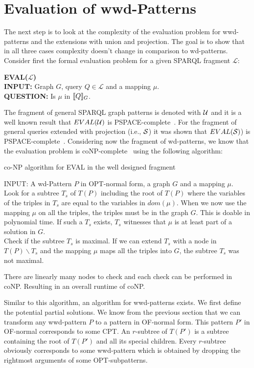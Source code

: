\section{Evaluation of wwd-Patterns}
The next step is to look at the complexity of the evaluation problem for
wwd-patterns and the extensions with union and projection. The goal is to show
that in all three cases complexity doesn't change in comparison to wd-patterns.
Consider first the formal evaluation problem for a given SPARQL fragment $\mathcal{L}$:
\begin{framed}\noindent \textbf{EVAL($\mathcal{L}$)}\\
	\textbf{INPUT:} Graph $G$, query $Q \in  \mathcal{L}$ and a mapping $\mu$.\\
	\textbf{QUESTION:} Is $\mu$ in $\llbracket Q \rrbracket_G$.
\end{framed}
The fragment of general SPARQL graph patterns is denoted with $\mathcal{U}$ and it is a
well known result that $EVAL(\mathcal{U})$ is PSPACE-complete~\cite{perez2009semantics}.
For the fragment of general queries extended with projection (i.e., $\mathcal{S}$)
it was shown that $EVAL(\mathcal{S})$) is PSPACE-complete~\cite{letelier2013static}.
Considering now the fragment of wd-patterns, we know that the evaluation problem
is coNP-complete~\cite{letelier2013static} using the following algorithm:
\begin{algorithm}
	\caption{co-NP algorithm for EVAL in the well designed fragment}
	INPUT: A wd-Pattern $P$ in OPT-normal form, a graph $G$ and a mapping
	$\mu$.\\
	Look for a subtree $T_s$ of $T(P)$ including the root of $T(P)$ where the
		variables of the triples in $T_s$ are equal to the variables in $dom(\mu)$. 
		When we now use the mapping $\mu$ on all the triples, the triples must
		be in the graph $G$. This is doable in polynomial time. If such a $T_s$
		exists, $T_s$ witnesses	that $\mu$ is at least part of a solution in
		$G$.\\
		Check if the subtree $T_s$ is maximal. If we can
		extend $T_s$ with a node in $T(P)\backslash T_s$ and the mapping $\mu$ maps
		all the triples into $G$, the subtree $T_s$ was not maximal. 
\end{algorithm}

There are linearly many nodes to check and each check can be performed in coNP.
Resulting in an overall runtime of coNP.

Similar to this algorithm, an algorithm for wwd-patterns exists. 
We first define the potential partial solutions. 
We know from the previous section that we can transform any wwd-pattern $P$ to a
pattern in OF-normal form. This pattern $P'$ in OF-normal corresponds to some
CPT. An $r$-subtree of $T(P')$ is a subtree containing the root of $T(P')$ and
all its special children. Every $r$-subtree obviously corresponds to some
wwd-pattern which is obtained by dropping the rightmost arguments of some
OPT-subpatterns.

